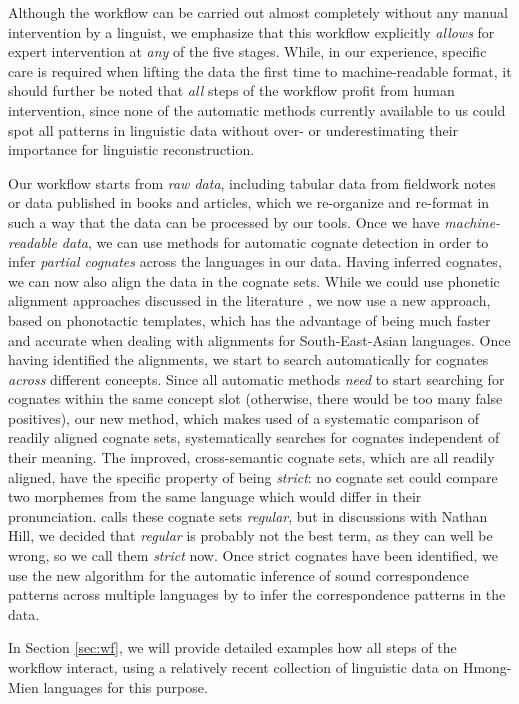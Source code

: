 \documentclass[xetex]{scrartcl}
\begin{document}
Although the workflow can be carried out almost completely without any manual intervention by a
linguist, we emphasize that this workflow explicitly \emph{allows} for expert intervention at
\emph{any} of the five stages. While, in our experience, specific care is required when lifting the
data the first time to machine-readable format, it should further be noted that \emph{all} steps of
the workflow profit from human intervention, since none of the automatic methods currently available
to us could spot all patterns in linguistic data without over- or underestimating their importance
for linguistic reconstruction.

Our workflow starts from \emph{raw data}, including tabular data from fieldwork notes or data
published in books and articles, which we re-organize and re-format in such a way that the data can
be processed by our tools. Once we have \emph{machine-readable data}, we can use methods for
automatic cognate detection \citep{List2016g} in order to infer \emph{partial cognates} across the
languages in our data. Having inferred cognates, we can now also align the data in the cognate sets.
While we could use phonetic alignment approaches discussed in the literature \citep{List2014d}, we
now use a new approach, based on phonotactic templates, which has the advantage of being much
faster and accurate when dealing with alignments for South-East-Asian languages. Once having
identified the alignments, we start to search automatically for cognates \emph{across} different
concepts. Since all automatic methods \emph{need} to start searching for cognates within the same
concept slot (otherwise, there would be too many false positives), our new method, which makes used
of a systematic comparison of readily aligned cognate sets, systematically searches for cognates
independent of their meaning. The improved, cross-semantic cognate sets, which are all readily
aligned, have the specific property of being \emph{strict}: no cognate set could compare two
morphemes from the same language which would differ in their pronunciation. \citep{List2018PBLOG7}
calls these cognate sets \emph{regular}, but in discussions with Nathan Hill, we decided that
\emph{regular} is probably not the best term, as they can well be wrong, so we call them
\emph{strict} now. Once strict cognates have been identified, we use the new algorithm for the
automatic inference of sound correspondence patterns across multiple languages by \citet{List2019a}
to infer the correspondence patterns in the data.

In Section \ref{sec:wf}, we will provide detailed examples how all steps of the workflow interact,
using a relatively recent collection of linguistic data on Hmong-Mien languages \citep{Chen2012} for
this purpose.
\end{document}
